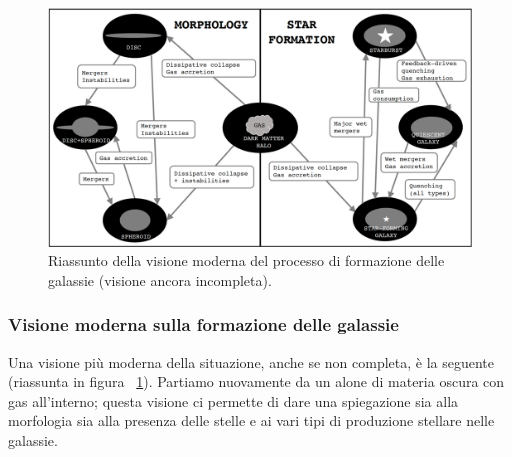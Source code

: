 \begin{figure}
    \centering
    \includegraphics[width = \textwidth]{immagini/formazione-delle-galassie-visione-moderna.png}
    \caption{Riassunto della visione moderna del processo di formazione delle galassie (visione ancora incompleta).}
    \label{fig:formazione-delle-galassie-visione-moderna}
\end{figure}

\subsubsection{Visione moderna sulla formazione delle galassie}
Una visione più moderna della situazione, anche se non completa, è la seguente (riassunta in figura ~\ref{fig:formazione-delle-galassie-visione-moderna}). Partiamo nuovamente da un alone di materia oscura con gas all’interno; questa visione ci permette di dare una spiegazione sia alla morfologia sia alla presenza delle stelle e ai vari tipi di produzione stellare nelle galassie.

